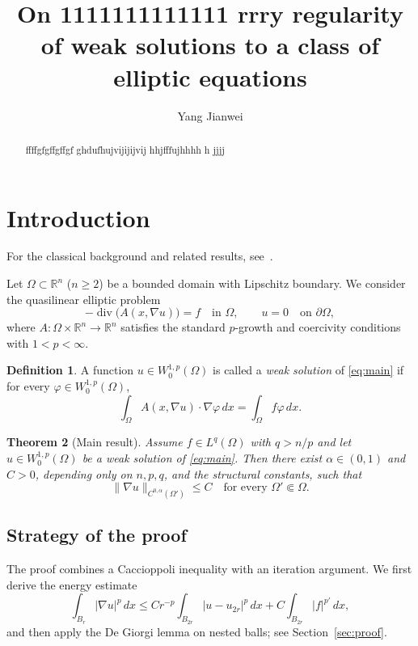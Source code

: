\documentclass[11pt,reqno]{amsart}
\title[Short title]{On 1111111111111 rrry regularity of weak solutions to a class of elliptic equations}
\author{Yang Jianwei}
\newtheorem{theorem}{Theorem}[section]
\theoremstyle{definition}
\newtheorem{definition}[theorem]{Definition}
\newcommand{\R}{\mathbb{R}}
\newcommand{\Om}{\Omega}
\begin{document}
\begin{abstract}ffffgfgffgffgf ghdufhujvijijijvij hhjfffujhhhh h  jjjj
\end{abstract}

\maketitle

\section{Introduction}\label{sec:intro}
For the classical background and related results, see~\cite{GT,LU}.

Let $\Om\subset\R^n$ ($n\ge 2$) be a bounded domain with Lipschitz boundary.
We consider the quasilinear elliptic problem
\begin{equation}\label{eq:main}
  -\operatorname{div}\bigl(A(x,\nabla u)\bigr)=f \quad \text{in } \Om,
  \qquad u=0 \quad \text{on } \partial\Om ,
\end{equation}
where $A:\Om\times\R^n\to\R^n$ satisfies the standard $p$-growth and
coercivity conditions with $1<p<\infty$.

\begin{definition}\label{def:weak}
A function $u\in W^{1,p}_0(\Om)$ is called a \emph{weak solution} of
\eqref{eq:main} if for every $\varphi\in W^{1,p}_0(\Om)$,
\begin{equation}\label{eq:weak}
  \int_{\Om} A(x,\nabla u)\cdot\nabla\varphi\,dx
  = \int_{\Om} f\varphi\,dx .
\end{equation}
\end{definition}

\begin{theorem}[Main result]\label{thm:main}
Assume $f\in L^q(\Om)$ with $q>n/p$ and let $u\in W^{1,p}_0(\Om)$ be a weak
solution of \eqref{eq:main}. Then there exist $\alpha\in(0,1)$ and $C>0$,
depending only on $n,p,q$, and the structural constants, such that
\begin{equation}\label{eq:holder}
  \|\nabla u\|_{C^{0,\alpha}(\Om')} \le C
  \quad\text{for every } \Om'\Subset\Om .
\end{equation}
\end{theorem}

\subsection{Strategy of the proof}
The proof combines a Caccioppoli inequality with an iteration argument.
We first derive the energy estimate
\begin{equation}
  \int_{B_r} |\nabla u|^p\,dx
  \le C r^{-p}\int_{B_{2r}} |u-u_{2r}|^p\,dx + C\int_{B_{2r}}|f|^{p'}\,dx ,
\end{equation}
and then apply the De Giorgi lemma on nested balls; see
Section~\ref{sec:proof}.
\end{document}
